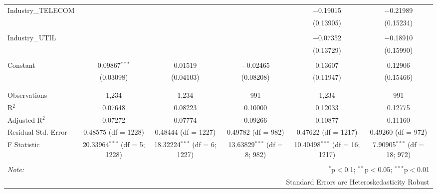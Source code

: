 \begin{table}[!htbp]
\begin{tabular}{@{\extracolsep{5pt}}lccccc}
 Industry\_TELECOM &  &  &  & $-$0.19015 & $-$0.21989 \\ 
  &  &  &  & (0.13905) & (0.15234) \\ 
  & & & & & \\ 
 Industry\_UTIL &  &  &  & $-$0.07352 & $-$0.18910 \\ 
  &  &  &  & (0.13729) & (0.15990) \\ 
  & & & & & \\ 
 Constant & 0.09867$^{***}$ & 0.01519 & $-$0.02465 & 0.13607 & 0.12906 \\ 
  & (0.03098) & (0.04103) & (0.08208) & (0.11947) & (0.15466) \\ 
  & & & & & \\ 
\hline \\[-1.8ex] 
Observations & 1,234 & 1,234 & 991 & 1,234 & 991 \\ 
R$^{2}$ & 0.07648 & 0.08223 & 0.10000 & 0.12033 & 0.12775 \\ 
Adjusted R$^{2}$ & 0.07272 & 0.07774 & 0.09266 & 0.10877 & 0.11160 \\ 
Residual Std. Error & 0.48575 (df = 1228) & 0.48444 (df = 1227) & 0.49782 (df = 982) & 0.47622 (df = 1217) & 0.49260 (df = 972) \\ 
F Statistic & 20.33964$^{***}$ (df = 5; 1228) & 18.32224$^{***}$ (df = 6; 1227) & 13.63829$^{***}$ (df = 8; 982) & 10.40498$^{***}$ (df = 16; 1217) & 7.90905$^{***}$ (df = 18; 972) \\ 
\hline 
\hline \\[-1.8ex] 
\textit{Note:}  & \multicolumn{5}{r}{$^{*}$p$<$0.1; $^{**}$p$<$0.05; $^{***}$p$<$0.01} \\ 
 & \multicolumn{5}{r}{Standard Errors are Heteroskedasticity Robust} \\ 
\end{tabular} 
\end{table} 

